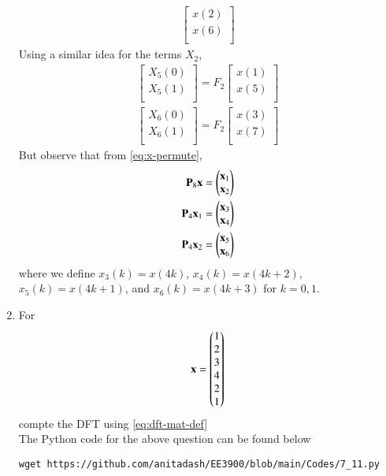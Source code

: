 \documentclass[journal,12pt,twocolumn]{IEEEtran}
\renewcommand\thesection{\arabic{section}}
\begin{document}
\begin{enumerate}[label=\thesection.\arabic*]
\begin{align}
\begin{bmatrix}
x(2) \\ 
x(6) \\ 
\end{bmatrix}
\end{align}
Using a similar idea for the terms $X_2$, 
\begin{align}
\begin{bmatrix}
X_{5}(0) \\ 
X_{5}(1)\\ 
\end{bmatrix}
= F_{2}
\begin{bmatrix}
x(1) \\ 
x(5) \\ 
\end{bmatrix} \\
\begin{bmatrix}
X_{6}(0) \\ 
X_{6}(1)\\ 
\end{bmatrix}
= F_{2}
\begin{bmatrix}
x(3) \\ 
x(7) \\ 
\end{bmatrix}
\end{align}
But observe that from \eqref{eq:x-permute},
\begin{align}
	\mathbf{P}_8\mathbf{x} &= \begin{pmatrix}\mathbf{x}_1\\\mathbf{x}_2\end{pmatrix} \\
	\mathbf{P}_4\mathbf{x}_1 &= \begin{pmatrix}\mathbf{x}_3\\\mathbf{x}_4\end{pmatrix} \\ 
	\mathbf{P}_4\mathbf{x}_2 &= \begin{pmatrix}\mathbf{x}_5\\\mathbf{x}_6\end{pmatrix}
\end{align}
where we define $x_3(k) = x(4k)$, $x_4(k) = x(4k + 2)$, $x_5(k) = x(4k + 1)$, and $x_6(k) = x(4k + 3)$ for $k = 0, 1$.
\item For 
    \begin{align}
	    \mathbf{x} = \begin{pmatrix}1\\2\\3\\4\\2\\1\end{pmatrix}
        \label{eq:equation1}
    \end{align}
    compte the DFT  
		using 
	    \eqref{eq:dft-mat-def}\\
\solution The Python code for the above question can be found below
\begin{lstlisting}
wget https://github.com/anitadash/EE3900/blob/main/Codes/7_11.py

\end{lstlisting}
\end{enumerate}
\end{document}
